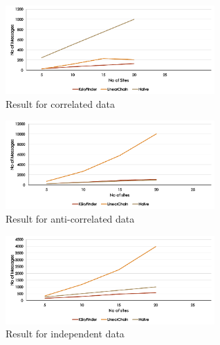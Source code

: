 \documentclass[twocolumn]{article}
\begin{document}
\begin{figure}[htp]
\centering
\includegraphics[width=8cm]{cor}
\caption{Result for correlated data}
\label{fig:cor}
\end{figure}
\begin{figure}[htp]
\centering
\includegraphics[width=8cm]{ant}
\caption{Result for anti-correlated data}
\label{fig:ant}
\end{figure}
\begin{figure}[htp]
\centering
\includegraphics[width=8cm]{ind}
\caption{Result for independent data}
\label{fig:ind}
\end{figure}
\end{document}

